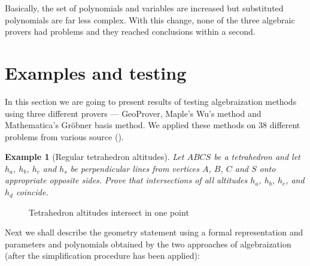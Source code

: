 \documentclass[final,1p,times,authoryear]{elsarticle}
\newtheorem{example}[theorem]{Example}
\begin{document}
Basically, the set of polynomials and variables are increased but
substituted polynomials are far less complex. With this change, none
of the three algebraic provers had problems and they reached
conclusions within a second.

\section{Examples and testing}

In this section we are going to present results of testing
algebraization methods using three different provers --- GeoProver,
Maple's Wu's method and Mathematica's Gr\"obner basis method. We
applied these methods on 38 different problems from various source
(\cite{janicic1997zbirka, shao2016challenging, arhzbirka, kinknjiga}).

\begin{example}[Regular tetrahedron altitudes]\label{prvi} 
  Let $ABCS$ be a tetrahedron and let $h_a$, $h_b$, $h_c$ and $h_s$ be
  perpendicular lines from vertices $A$, $B$, $C$ and $S$ onto
  appropriate opposite sides. Prove that intersections of all
  altitudes $h_a$, $h_b$, $h_c$, and $h_d$ coincide.
\end{example}

\begin{figure}[!hb]
\begin{center}

\end{center}
\caption{Tetrahedron altitudes intersect in one point}
\end{figure}

Next we shall describe the geometry statement using a formal
representation and parameters and polynomials obtained by the two
approaches of algebraization (after the simplification procedure has
been applied):

\end{document}
